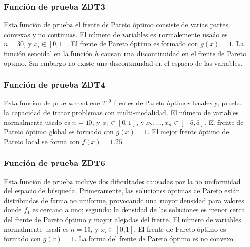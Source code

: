 \subsubsection*{Función de prueba ZDT3}
Esta función de prueba el frente de Pareto óptimo consiste de varias partes convexas y no continuas.
El número de variables es normalemente usado es $n=30$, y $x_i \in [0,1]$. El frente de Pareto óptimo es formado con $g(x)=1$.
%
La función senoidal en la función $h$ causan una discontinuidad en el frente de Pareto óptimo.
%
Sin embargo no existe una discontinuidad en el espacio de las variables.

\subsubsection*{Función de prueba ZDT4}
Esta función de prueba contiene $21^9$ frentes de Pareto óptimos locales y, prueba la capacidad de tratar problemas con multi-modalidad.
El número de variables normalmente usado es $n=10$, y $x_1 \in [0,1]$, y $x_2, ..., x_n \in [-5, 5]$. El frente de Pareto óptimo global es formado con $g(x)=1$.
%
El mejor frente óptimo de Pareto local se forma con $f(x)=1.25$

\subsubsection*{Función de prueba ZDT6}
Esta función de prueba incluye dos dificultades causadas por la no uniformidad del espacio de búsqueda. Primeramente, las soluciones óptimas de Pareto est\'an distribuidas de forma no uniforme, provocando una mayor densidad para valores donde $f_1$ es cercano a uno; segundo: la densidad de las soluciones es menor cerca del frente de Pareto óptimo y mayor alejadas del frente.
El número de variables normalmente usadi es $n=10$, y $x_i \in [0,1]$. El frente de Pareto óptimo es formado con $g(x)=1$.
%
La forma del frente de Pareto óptimo es no convexo.


